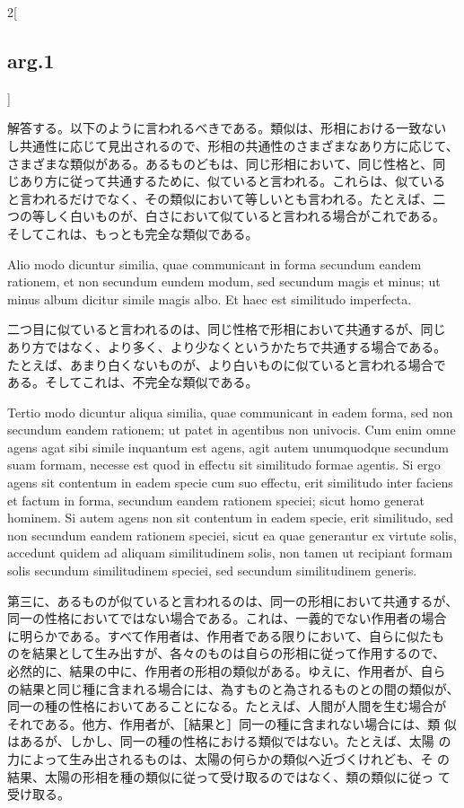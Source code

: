 \documentclass[paper=a4paper,fontsize=10pt,jafontsize=9pt,titlepage]{jlreq}
\begin{document}
\begin{paracol}{2}[\subsection{arg.1}]
\switchcolumn

解答する。以下のように言われるべきである。類似は、形相における一致ない
し共通性に応じて見出されるので、形相の共通性のさまざまなあり方に応じて、
さまざまな類似がある。あるものどもは、同じ形相において、同じ性格と、同
じあり方に従って共通するために、似ていると言われる。これらは、似ている
と言われるだけでなく、その類似において等しいとも言われる。たとえば、二
つの等しく白いものが、白さにおいて似ていると言われる場合がこれである。
そしてこれは、もっとも完全な類似である。

\switchcolumn*

Alio modo dicuntur similia, quae communicant in forma secundum eandem
rationem, et non secundum eundem modum, sed secundum magis et minus;
ut minus album dicitur simile magis albo. Et haec est similitudo
imperfecta.

\switchcolumn

二つ目に似ていると言われるのは、同じ性格で形相において共通するが、同じ
あり方ではなく、より多く、より少なくというかたちで共通する場合である。
たとえば、あまり白くないものが、より白いものに似ていると言われる場合で
ある。そしてこれは、不完全な類似である。

\switchcolumn*

Tertio modo dicuntur aliqua similia, quae communicant in eadem forma,
sed non secundum eandem rationem; ut patet in agentibus non
univocis. Cum enim omne agens agat sibi simile inquantum est agens,
agit autem unumquodque secundum suam formam, necesse est quod in
effectu sit similitudo formae agentis. Si ergo agens sit contentum in
eadem specie cum suo effectu, erit similitudo inter faciens et factum
in forma, secundum eandem rationem speciei; sicut homo generat
hominem. Si autem agens non sit contentum in eadem specie, erit
similitudo, sed non secundum eandem rationem speciei, sicut ea quae
generantur ex virtute solis, accedunt quidem ad aliquam similitudinem
solis, non tamen ut recipiant formam solis secundum similitudinem
speciei, sed secundum similitudinem generis.

\switchcolumn

第三に、あるものが似ていると言われるのは、同一の形相において共通するが、
同一の性格においてではない場合である。これは、一義的でない作用者の場合
に明らかである。すべて作用者は、作用者である限りにおいて、自らに似たも
のを結果として生み出すが、各々のものは自らの形相に従って作用するので、
必然的に、結果の中に、作用者の形相の類似がある。ゆえに、作用者が、自ら
の結果と同じ種に含まれる場合には、為すものと為されるものとの間の類似が、
同一の種の性格においてあることになる。たとえば、人間が人間を生む場合が
それである。他方、作用者が、［結果と］同一の種に含まれない場合には、類
似はあるが、しかし、同一の種の性格における類似ではない。たとえば、太陽
の力によって生み出されるものは、太陽の何らかの類似へ近づくけれども、そ
の結果、太陽の形相を種の類似に従って受け取るのではなく、類の類似に従っ
て受け取る。


\end{paracol}
\end{document}
